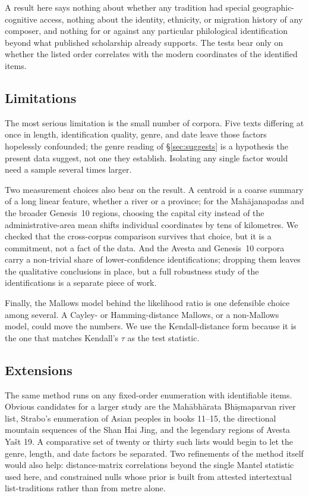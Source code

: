 \documentclass[11pt]{article}
\begin{document}
A result here says nothing about whether any tradition had special
geographic-cognitive access, nothing about the identity, ethnicity,
or migration history of any composer, and nothing for or against any
particular philological identification beyond what published
scholarship already supports. The tests bear only on whether the
listed order correlates with the modern coordinates of the
identified items.

\subsection{Limitations}\label{sec:limits}

The most serious limitation is the small number of corpora. Five
texts differing at once in length, identification quality, genre,
and date leave those factors hopelessly confounded; the genre
reading of §\ref{sec:suggests} is a hypothesis the present data
suggest, not one they establish. Isolating any single factor would
need a sample several times larger.

Two measurement choices also bear on the result. A centroid is a
coarse summary of a long linear feature, whether a river or a
province; for the Mahājanapadas and the broader Genesis~10 regions,
choosing the capital city instead of the administrative-area mean
shifts individual coordinates by tens of kilometres. We checked that
the cross-corpus comparison survives that choice, but it is a
commitment, not a fact of the data. And the Avesta and Genesis~10
corpora carry a non-trivial share of lower-confidence
identifications; dropping them leaves the qualitative conclusions in
place, but a full robustness study of the identifications is a
separate piece of work.

Finally, the Mallows model behind the likelihood ratio is one defensible
choice among several. A Cayley- or Hamming-distance Mallows, or a
non-Mallows model, could move the numbers. We use the
Kendall-distance form because it is the one that matches Kendall's
$\tau$ as the test statistic.

\subsection{Extensions}\label{sec:extensions}

The same method runs on any fixed-order enumeration with
identifiable items. Obvious candidates for a larger study are the
Mahābhārata Bhīṣmaparvan river list, Strabo's enumeration of Asian
peoples in books 11--15, the directional mountain sequences of the
Shan Hai Jing, and the legendary regions of Avesta Yašt 19. A
comparative set of twenty or thirty such lists would begin to let
the genre, length, and date factors be separated. Two refinements of
the method itself would also help: distance-matrix correlations
beyond the single Mantel statistic used here, and constrained nulls
whose prior is built from attested intertextual list-traditions
rather than from metre alone.
\end{document}
